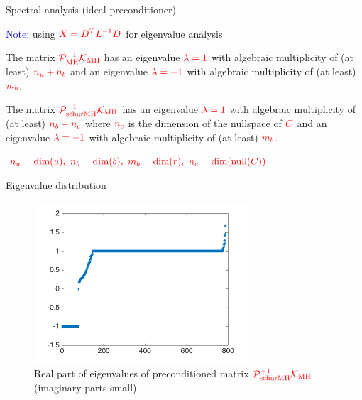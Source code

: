 \documentclass[12pt]{beamer}
\newcommand{\re}[1]{{\textcolor{red}       {#1}}}
\newcommand{\bl}[1]{{\textcolor{blue}{#1}}}
\begin{document}
\begin{frame}{Spectral analysis (ideal preconditioner)}

\bl{Note:} using $\re{X = D^T L^{-1} D}$ for eigenvalue analysis

\begin{theorem}
\label{thm:mhd_outer_ideal}
The matrix $\re{\mathcal{P}_{\rm MH}^{-1} \mathcal{K}_{\rm MH} }$ has an eigenvalue $\re{\lambda = 1}$ with algebraic multiplicity of (at least) $\re{n_u + n_b}$ and an eigenvalue $\re{\lambda = -1}$ with  algebraic multiplicity of (at least) $\re{m_b}$.
\end{theorem}

\begin{theorem}
\label{thm:mhd_outer_schur}
The matrix $\re{\mathcal{P}_{\rm schurMH}^{-1} \mathcal{K}_{\rm MH}} $ has an eigenvalue $\re{\lambda = 1}$ with algebraic multiplicity of (at least) $\re{n_b+n_c}$ where $\re{n_c}$ is the dimension of the nullspace of $\re{C}$ and an eigenvalue $\re{\lambda = -1}$ with  algebraic multiplicity of (at least) $\re{m_b}$.
\end{theorem}
$\re{n_u = \mbox{dim}(u), \ n_b = \mbox{dim}(b), \ m_b = \mbox{dim}(r), \ n_c = \mbox{dim}(\mbox{null}(C))}$
\end{frame}

\begin{frame}{Eigenvalue distribution}

\begin{figure}[h!]
    \centering
    \includegraphics[width=80mm]{figures/Eigen}
    \caption{Real part of eigenvalues of preconditioned matrix $\re{\mathcal{P}_{\rm schurMH}^{-1} \mathcal{K}_{\rm MH}}$ (imaginary parts small)}
\end{figure}




\end{frame}
\end{document}
